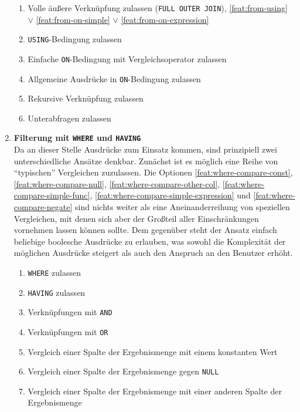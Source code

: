 \begin{enumerate}
\begin{enumerate}
  \item \label{feat:from-full-join} Volle äußere Verknüpfung zulassen (\texttt{FULL OUTER JOIN}), \ref{feat:from-using} $\lor$ \ref{feat:from-on-simple} $\lor$ \ref{feat:from-on-expression}
  \item \label{feat:from-using} \texttt{USING}-Bedingung zulassen
  \item \label{feat:from-on-simple} Einfache \texttt{ON}-Bedingung mit Vergleichsoperator zulassen
  \item \label{feat:from-on-expression} Allgemeine Ausdrücke in \texttt{ON}-Bedingung zulassen
  \item \label{feat:from-recursive} Rekursive Verknüpfung zulassen 
  \item \label{feat:from-sub} Unterabfragen zulassen
  \end{enumerate}
\item \textbf{Filterung mit \texttt{WHERE} und \texttt{HAVING}} \\
  Da an dieser Stelle Ausdrücke zum Einsatz kommen, sind prinzipiell zwei unterschiedliche Ansätze denkbar. Zunächst ist es möglich eine Reihe von ``typischen'' Vergleichen zuzulassen. Die Optionen \ref{feat:where-compare-const}, \ref{feat:where-compare-null}, \ref{feat:where-compare-other-col}, \ref{feat:where-compare-simple-func}, \ref{feat:where-compare-simple-expression} und \ref{feat:where-compare-negate} sind nichts weiter als eine Aneinanderreihung von speziellen Vergleichen, mit denen sich aber der Großteil aller Einschränkungen vornehmen lassen können sollte. Dem gegenüber steht der Ansatz einfach beliebige boolesche Ausdrücke zu erlauben, was sowohl die Komplexität der möglichen Ausdrücke steigert als auch den Anspruch an den Benutzer erhöht.
  \begin{enumerate}
  \item \label{feat:where-allow} \texttt{WHERE} zulassen
  \item \label{feat:having-allow} \texttt{HAVING} zulassen
  \item \label{feat:where-and} Verknüpfungen mit \texttt{AND}
  \item \label{feat:where-or} Verknüpfungen mit \texttt{OR}
  \item \label{feat:where-compare-const} Vergleich einer Spalte der Ergebnismenge mit einem konstanten Wert
  \item \label{feat:where-compare-null} Vergleich einer Spalte der Ergebnismenge gegen \texttt{NULL}
  \item \label{feat:where-compare-other-col} Vergleich einer Spalte der Ergebnismenge mit einer anderen Spalte der Ergebnismenge

\end{enumerate}
\end{enumerate}
